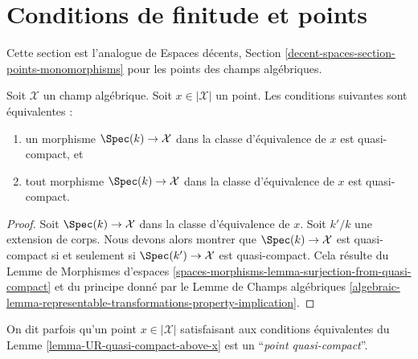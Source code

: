 \section{Conditions de finitude et points}
\label{section-points-conditions}

\noindent
Cette section est l'analogue de
Espaces décents, Section \ref{decent-spaces-section-points-monomorphisms}
pour les points des champs algébriques.

\begin{lemma}
\label{lemma-UR-quasi-compact-above-x}
Soit $\mathcal{X}$ un champ algébrique. Soit $x \in |\mathcal{X}|$
un point. Les conditions suivantes sont équivalentes :
\begin{enumerate}
\item un morphisme $\Spec(k) \to \mathcal{X}$ dans la classe d'équivalence
de $x$ est quasi-compact, et
\item tout morphisme $\Spec(k) \to \mathcal{X}$ dans la classe d'équivalence
de $x$ est quasi-compact.
\end{enumerate}
\end{lemma}

\begin{proof}
Soit $\Spec(k) \to \mathcal{X}$ dans la classe d'équivalence
de $x$. Soit $k'/k$ une extension de corps.
Nous devons alors montrer que $\Spec(k) \to \mathcal{X}$ est
quasi-compact si et seulement si $\Spec(k') \to \mathcal{X}$
est quasi-compact. Cela résulte du
Lemme de Morphismes d'espaces
\ref{spaces-morphisms-lemma-surjection-from-quasi-compact}
et du principe donné par le Lemme de Champs algébriques
\ref{algebraic-lemma-representable-transformations-property-implication}.
\end{proof}

\noindent
On dit parfois qu'un point $x \in |\mathcal{X}|$ satisfaisant
aux conditions équivalentes du Lemme \ref{lemma-UR-quasi-compact-above-x}
est un ``{\it point quasi-compact}''.















